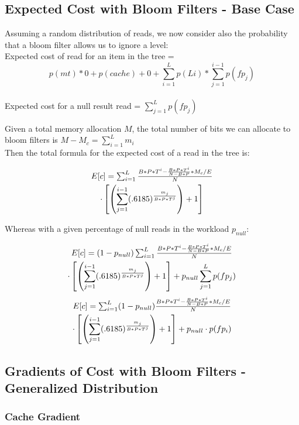 \documentclass{cidr-2019}
\begin{document}
\subsection{Expected Cost with Bloom Filters - Base Case}

Assuming a random distribution of reads, we now consider also the probability that a bloom filter allows us to ignore a level: \\
Expected cost of read for an item in the tree = $$p(mt) * 0  + p(cache) + 0 + \sum_{i=1}^L p(Li) * \sum_{j=1}^{i-1} p(fp_j)$$ \\
Expected cost for a null result read = $\sum_{j=1}^{L} p(fp_j)$

Given a total memory allocation $M$, the total number of bits we can allocate
to bloom filters is $M-M_c = \sum_{i=1}^L m_i$ \\ Then the total formula for
the expected cost of a read in the tree is: 

\begin{multline}
$$E[c] = \sum_{i=1}^{L} \frac{B*P*T^i - \frac{B*P*T^i}{N-B*P} * M_c/E}{N} \\ \cdot \left[ \left(\sum_{j=1}^{i-1} (.6185) ^  {\frac{m_j}{B*P*T^j}}\right) +1 \right]$$ 
\end{multline}

Whereas with a given percentage of null reads in the workload $p_{null}$:

\begin{multline}
$$E[c] = (1-p_{null})\sum_{i=1}^{L} \frac{B*P*T^i - \frac{B*P*T^i}{N-B*P} * M_c/E}{N} \\ \cdot \left[ \left(\sum_{j=1}^{i-1} (.6185) ^  {\frac{m_j}{B*P*T^j}}\right) +1 \right] + p_{null}\sum_{j=1}^{L} p(fp_j)$$
\end{multline}
\begin{multline}
$$E[c] = \sum_{i=1}^{L} (1-p_{null})\frac{B*P*T^i - \frac{B*P*T^i}{N-B*P} * M_c/E}{N} \\ \cdot \left[ \left(\sum_{j=1}^{i-1} (.6185) ^  {\frac{m_j}{B*P*T^j}}\right) +1 \right] + p_{null} \cdot p(fp_i) $$
\end{multline}

\subsection{Gradients of Cost with Bloom Filters - Generalized Distribution}

\subsubsection{Cache Gradient}
\end{document}
